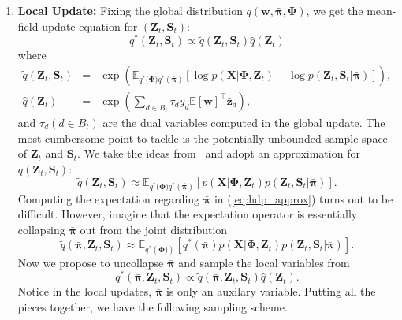 \documentclass[twoside,11pt]{article}
\newcommand{\Zv}{\bm{Z}}
\newcommand{\Sv}{\bm{S}}
\newcommand{\wv}{\bm{w}}
\newcommand{\Phiv}{\bm{\Phi}}
\newcommand{\barpiv}{\bm{\bar{\pi}}}
\newcommand{\ep}{\mathbb{E}}
\newcommand{\barzv}{\bm{\bar{z}}}
\newcommand{\strin}[1]{\todo[size=\small, color=green!40]{\bf\sf  #1}}
\newcommand{\jun}[1]{\marginpar{\color{blue}\tiny{Jun: #1}}}
\begin{document}
\begin{enumerate}
\item \textbf{Local Update:} Fixing the global distribution $q(\bm{w}, \barpiv, \Phiv)$, we get the mean-field update equation for $(\Zv_t, \Sv_t)$: %
\begin{equation} \label{eq:pamedhdp_zlambdas}
q^*(\bm{Z}_t, \bm{S}_t)  \propto \tilde{q}(\bm{Z}_t, \bm{S}_t) \hat{q}(\bm{Z}_t)
\end{equation}
where
\setlength\arraycolsep{1pt} \begin{eqnarray}
\tilde{q}(\bm{Z}_t, \bm{S}_t) &=& \exp\left( \mathbb{E}_{q^*(\bm{\Phi)} q^*(\bm{\bar{\pi}})}[\log p( \bm{X} | \bm{\Phi},  \bm{Z}_t)+\log p(\bm{Z}_t, \bm{S}_t | \bm{\bar{\pi}})] \right), \nonumber \\
\hat{q}(\bm{Z}_t) &=& \exp\left( \sum\limits_{d \in B_t}{\tau_d y_d \ep[\wv]^\top \barzv_d} \right), \nonumber
\end{eqnarray}
and $\tau_d (d \in B_t)$ are the dual variables computed in the global update. The most cumbersome point to tackle is the potentially unbounded sample space of $\Zv_t$ and $\Sv_t$. We take the ideas from~\citep{wang2012truncation} and adopt an approximation for $\tilde{q}(\Zv_t, \Sv_t)$:
\begin{equation} \label{eq:hdp_approx}
\tilde{q}(\bm{Z}_t, \bm{S}_t) \approx \mathbb{E}_{q^*(\bm{\Phi)} q^*(\bm{\bar{\pi}})}\left[ p(\bm{X} | \bm{\Phi}, \bm{Z}_t) p(\bm{Z}_t, \bm{S}_t | \bm{\bar{\pi}}) \right].
\end{equation}
Computing the expectation regarding $\barpiv$ in (\ref{eq:hdp_approx}) turns out to be difficult. However, imagine that the expectation operator is essentially collapsing $\barpiv$ out from the joint distribution
\begin{equation} \label{eq:hdp_approx_augmented}
\tilde{q}(\barpiv, \bm{Z}_t, \bm{S}_t) \approx \mathbb{E}_{q^*(\bm{\Phi)})}\left[ q^*(\barpiv) p(\bm{X} | \bm{\Phi}, \bm{Z}_t) p(\bm{Z}_t, \bm{S}_t | \bm{\bar{\pi}}) \right].
\end{equation}
%
Now we propose to uncollapse $\barpiv$ and sample the local variables from
\begin{equation}
q^*(\barpiv, \Zv_t, \Sv_t) \propto \tilde{q}(\barpiv, \bm{Z}_t, \bm{S}_t) \hat{q}(\bm{Z}_t).
\end{equation}
Notice in the local updates, $\barpiv$ is only an auxilary variable. Putting all the pieces together, we have the following sampling scheme.

\end{enumerate}
\end{document}
